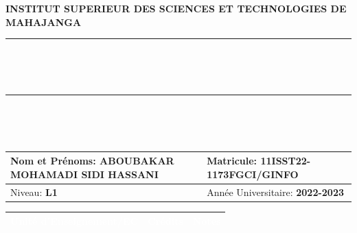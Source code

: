 \documentclass[a4paper, 10pt]{article}
\begin{document}
\centering \uppercase{\textbf{institut superieur des sciences et technologies de mahajanga}}\\
\centering \rule{0.4\textwidth}{0.5pt}\\
\begin{spacing}{1.5}
	\\
\end{spacing}
\centering \rule{0.4\textwidth}{0.5pt}\\
%
%
%
\begin{spacing}{1.5}
	\\
\end{spacing}
%
%
%
\centering
\begin{tabularx}{\textwidth}{|X|X|}
	\hline
	Nom et Prénoms: \textbf{ABOUBAKAR MOHAMADI SIDI HASSANI} & Matricule: \textbf{11ISST22-1173FGCI/GINFO}       \\ \hline
	Niveau: \textbf{L1}                    & Année Universitaire: \textbf{2022-2023} \\	\hline
\end{tabularx}
%
%
\centering
\begin{tabularx}{\textwidth}{|b|s|s|}
	\hline
	 \textcolor{white}{\textbf{Unité d'Enseignement/EC}} &  \textcolor{white}{\textbf{Crédits}} &  \textcolor{white}{\textbf{Notes}} \\ \hline
	
\end{tabularx}
\end{document}
